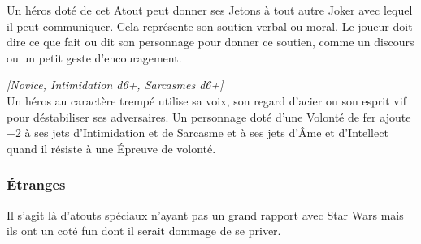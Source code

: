 \begin{description}[align=left]
        Un héros doté de cet Atout peut donner ses Jetons à tout autre Joker avec lequel il peut communiquer. Cela représente son soutien verbal ou moral. Le joueur doit dire ce que fait ou dit son personnage pour donner ce soutien, comme un discours ou un petit geste d’encouragement.

    \item [Volonté de Fer]
        \emph{[Novice, Intimidation d6+, Sarcasmes d6+]}\\
        Un héros au caractère trempé utilise sa voix, son regard d’acier ou son esprit vif pour déstabiliser ses adversaires. Un personnage doté d’une Volonté de fer ajoute +2 à ses jets d’Intimidation et de Sarcasme et à ses jets d’\^Ame et d’Intellect quand il résiste à une Épreuve de volonté.
\end{description}

\newpage
\subsubsection{\'Etranges}

Il s’agit là d’atouts spéciaux n’ayant pas un grand rapport avec Star Wars mais ils ont un coté fun dont il serait dommage de se priver.

